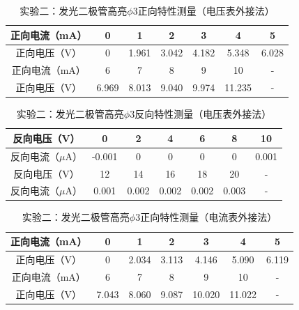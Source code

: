 \documentclass[a4paper]{article}
\begin{document}
    \begin{table}[!ht]
        \caption{实验二：发光二极管高亮$\phi3$正向特性测量（电压表外接法）}\label{tab:exp4}
        \begin{tabularx}{\textwidth}{c*{6}{C}} \toprule
            正向电流（mA） & 0 & 1 & 2 & 3 & 4 & 5 \\ \midrule
            正向电压（V） & 0 & 1.961 & 3.042 & 4.182 & 5.348 & 6.028 \\ \midrule
            正向电流（mA） & 6 & 7 & 8 & 9 & 10 & - \\ \midrule
            正向电压（V） & 6.969 & 8.013 & 9.040 & 9.974 & 11.235 & - \\
        \bottomrule
        \end{tabularx}
    \end{table}\vspace{10mm}
    \begin{table}[!ht]
        \caption{实验二：发光二极管高亮$\phi3$反向特性测量（电压表外接法）}\label{tab:exp4}
        \begin{tabularx}{\textwidth}{c*{6}{C}} \toprule
            反向电压（V） & 0 & 2 & 4 & 6 & 8 & 10 \\ \midrule
            反向电流（$\mu$A） & -0.001 & 0 & 0 & 0 & 0 & 0.001 \\ \midrule
            反向电压（V） & 12 & 14 & 16 & 18 & 20 & - \\ \midrule
            反向电流（$\mu$A）& 0.001 & 0.002 & 0.002 & 0.002 & 0.003 & - \\
        \bottomrule
        \end{tabularx}
    \end{table}\vspace{10mm}
    \begin{table}[!ht]
        \caption{实验二：发光二极管高亮$\phi3$正向特性测量（电流表外接法）}\label{tab:exp4}
        \begin{tabularx}{\textwidth}{c*{6}{C}} \toprule
            正向电流（mA） & 0 & 1 & 2 & 3 & 4 & 5 \\ \midrule
            正向电压（V） & 0 & 2.034 & 3.113 & 4.146 & 5.090 & 6.119 \\ \midrule
            正向电流（mA） & 6 & 7 & 8 & 9 & 10 & - \\ \midrule
            正向电压（V） & 7.043 & 8.060 & 9.087 & 10.020 & 11.022 & - \\
        \bottomrule
        \end{tabularx}
    \end{table}
\end{document}
